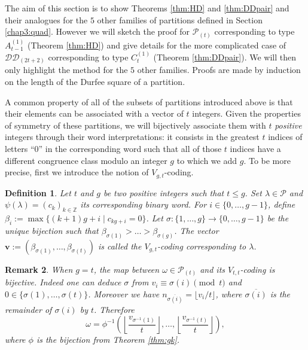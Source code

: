\documentclass[11pt,letterpaper]{amsart}
\def\bbbz{\mathbb Z}
\def\ccdd{\mathcal {DD}}
\def\ccp{\mathcal P}
\newtheorem{df}{Definition}[section]
\newtheorem{rk}[df]{Remark}
\numberwithin{equation}{section}
\numberwithin{df}{section}
\begin{document}
The aim of this section is to show Theorems \ref{thm:HD} and \ref{thm:DDpair} and their analogues for the $5$ other families of partitions defined in Section \ref{chap3:quad}. However we will sketch the proof for $\ccp_{(t)}$ corresponding to type $A^{(1)}_{t-1}$ (Theorem \ref{thm:HD}) and give details for the more complicated case of $\ccdd_{(2t+2)}$ corresponding to type $C^{(1)}_{t}$ (Theorem \ref{thm:DDpair}). We will then only highlight the method for the $5$ other families. Proofs are made by induction on the length of the Durfee square of a partition.


A common property of all of the subsets of partitions introduced above is that their elements can be associated with a vector of $t$ integers. Given the properties of symmetry of these partitions, we will bijectively associate them with $t$ \emph{positive} integers through their word interpretations: it consists in the greatest $t$ indices of letters ``$0$'' in the corresponding word such that all of those $t$ indices have a different congruence class modulo an integer $g$ to which we add $g$.
To be more precise, first we introduce the notion of $V_{g,t}$-coding.
\begin{df}\label{def:vcoding}
Let $t$ and $g$ be two positive integers such that $t\leq g$. Set $\lambda \in \ccp$ and $\psi(\lambda)=(c_k)_{k\in\bbbz}$ its corresponding binary word. For $i\in\lbrace 0,\dots,g-1\rbrace$, define $\beta_i:=\max\lbrace (k+1)g+i\mid c_{kg+i}=0\rbrace$. Let $\sigma:\lbrace 1,\dots,g\rbrace\rightarrow \lbrace 0,\dots,g-1\rbrace$ be the unique bijection such that $\beta_{\sigma(1)}>\dots>\beta_{\sigma(g)}$. The vector $\mathbf{v}:=(\beta_{\sigma(1)},\dots,\beta_{\sigma(t)})$ is called the $V_{g,t}$-coding corresponding to $\lambda$.
\end{df}


\begin{rk}\label{vcodingtypeA}
When $g=t$, the map between $\omega\in\ccp_{(t)}$ and its $V_{t,t}$-coding is bijective. Indeed one can deduce $\sigma$ from $v_i\equiv \sigma(i)\pmod{t}$ and $0\in\lbrace \sigma(1),\dots,\sigma(t)\rbrace$. Moreover we have $n_{\overline{\sigma(i)}}=\lfloor v_i/t\rfloor$,  where $\overline{\sigma(i)}$ is the remainder of $\sigma(i)$ by $t$. Therefore
$$\omega=\phi^{-1}\left(\left\lfloor\frac{v_{\sigma^{-1}(1)}}{t}\right\rfloor,\dots, \left\lfloor\frac{v_{\sigma^{-1}(t)}}{t}\right\rfloor\right),$$
where $\phi$ is the bijection from Theorem \ref{thm:gk}.
\end{rk}
\end{document}
